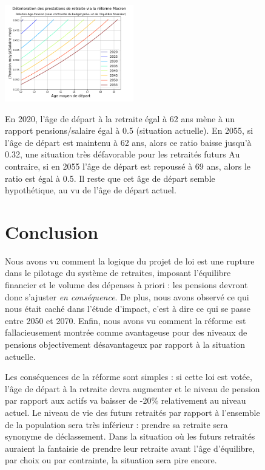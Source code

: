 \documentclass[10pt]{article}
\begin{document}
\begin{figure}
\centering
\includegraphics[width=0.5\textwidth]{Simulation-Age-vs-pensions-vs-date.png}

En 2020, l'âge de départ à la retraite égal à 62 ans 
mène à un rapport pensions/salaire égal à 0.5 (situation actuelle).  
En 2055, si l'âge de départ est maintenu à 62 ans, alors ce ratio baisse jusqu'à 0.32, 
une situation très défavorable pour les retraités futurs
Au contraire, si en 2055 l'âge de départ est repoussé à 69 ans, 
alors le ratio est égal à 0.5. 
Il reste que cet âge de départ semble hypothétique, au vu de l'âge de départ actuel. 


\section{Conclusion}

Nous avons vu comment la logique du projet de loi est une 
rupture dans le pilotage du système de retraites, 
imposant l'équilibre financier et le volume des dépenses 
à priori : les pensions devront donc s'ajuster \emph{en conséquence}. 
De plus, nous avons observé ce qui nous était caché dans l'étude 
d'impact, c'est à dire ce qui se passe entre 2050 et 2070. 
Enfin, nous avons vu comment la réforme est fallacieusement 
montrée comme avantageuse pour des niveaux de pensions 
objectivement désavantageux par rapport à la situation 
actuelle. 

Les conséquences de la réforme sont simples : 
si cette loi est votée, l'âge de départ à la retraite 
devra augmenter et le niveau de pension par rapport aux actifs va 
baisser de -20\% relativement au niveau actuel. 
Le niveau de vie des futurs retraités par rapport à l'ensemble de la 
population sera très inférieur : prendre sa retraite sera synonyme de 
déclassement. 
Dans la situation où les futurs retraités auraient la fantaisie 
de prendre leur retraite avant l'âge d'équilibre, par choix ou par contrainte, 
la situation sera pire encore. 


\end{figure}
\end{document}

